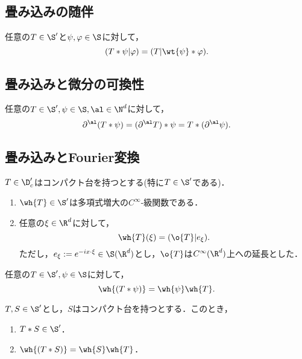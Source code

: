 \documentclass[uplatex,dvipdfmx]{jsreport}
\begin{document}
\subsection{畳み込みの随伴}

\begin{proposition}
    任意の$T\in\S'$と$\psi,\varphi\in\S$に対して，
    \[(T*\psi|\varphi)=(T|\wt{\psi}*\varphi).\]
\end{proposition}

\subsection{畳み込みと微分の可換性}

\begin{proposition}
    任意の$T\in\S',\psi\in\S,\al\in\N^d$に対して，
    \[\partial^\al(T*\psi)=(\partial^\al T)*\psi=T*(\partial^\al\psi).\]
\end{proposition}

\subsection{畳み込みとFourier変換}

\begin{lemma}
    $T\in\D_c'$はコンパクト台を持つとする(特に$T\in\S'$である)．
    \begin{enumerate}
        \item $\wh{T}\in\S'$は多項式増大の$C^\infty$-級関数である．
        \item 任意の$\xi\in\R^d$に対して，
        \[\wh{T}(\xi)=(\o{T}|e_{\xi}).\]
        ただし，$e_\xi:=e^{-ix\cdot\xi}\in\S(\R^d)$とし，$\o{T}$は$C^\infty(\R^d)$上への延長とした．
    \end{enumerate}
\end{lemma}

\begin{proposition}
    任意の$T\in\S',\psi\in\S$に対して，
    \[\wh{(T*\psi)}=\wh{\psi}\wh{T}.\]
\end{proposition}

\begin{proposition}
    $T,S\in\S'$とし，$S$はコンパクト台を持つとする．このとき，
    \begin{enumerate}
        \item $T*S\in\S'$．
        \item $\wh{(T*S)}=\wh{S}\wh{T}$．
    \end{enumerate}
\end{proposition}
\end{document}
